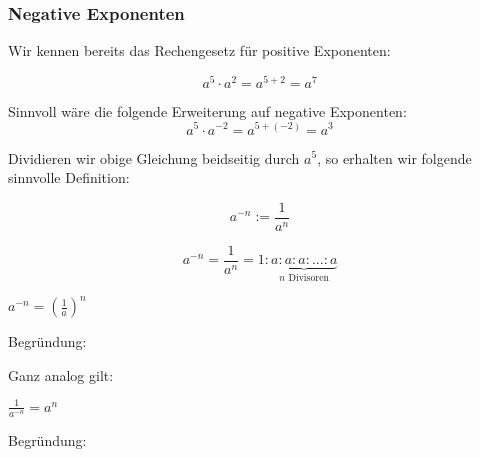\subsubsection{Negative Exponenten}
Wir kennen bereits das Rechengesetz für positive Exponenten:

$$a^5\cdot{}a^2 = a^{5+2} = a^7$$

Sinnvoll wäre die folgende Erweiterung auf negative
Exponenten:\\
$$a^5\cdot{}a^{-2} = a^{5+(-2)} = a^3$$

Dividieren wir obige Gleichung beidseitig durch $a^5$, so erhalten wir
folgende sinnvolle Definition:


\begin{definition}{}{}
$$a^{-n} := \frac{1}{a^n}$$
\end{definition}

\begin{bemerkung}{}{}
$$ a^{-n} =\frac1{a^n}= 1 : \underbrace{a : a : a : ... : a}_{n \text{\ Divisoren}}$$
\end{bemerkung}

\begin{gesetz}{}{}
$a^{-n} = \left(\frac1a\right)^n$
\end{gesetz}
Begründung:



Ganz analog gilt:

\begin{gesetz}{}{}
$\frac{1}{a^{-n}} =a^n$
\end{gesetz}
Begründung:



